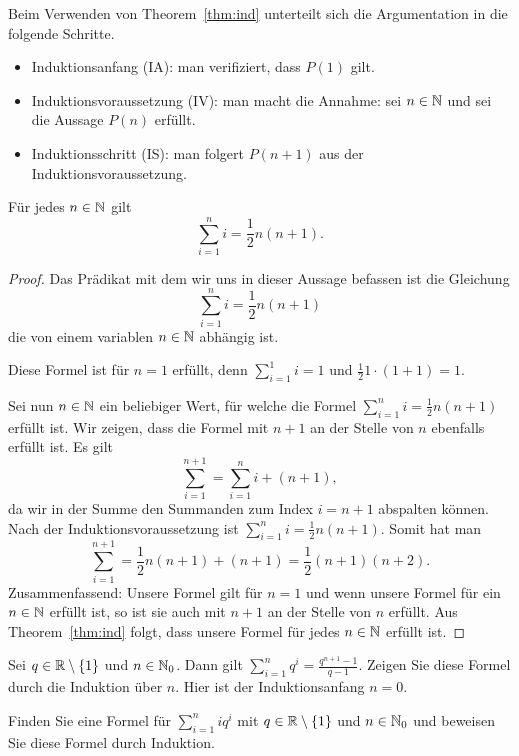 \begin{bem}
	Beim Verwenden von Theorem~\ref{thm:ind} unterteilt sich die Argumentation in die folgende Schritte. 
	\begin{itemize}
		\item Induktionsanfang (IA): man verifiziert, dass $P(1)$ gilt. 
		\item Induktionsvoraussetzung (IV): man macht die Annahme: sei $n \in \mathbb{N}$ und sei die Aussage $P(n)$ erfüllt. 
		\item Induktionsschritt (IS): man folgert $P(n+1)$ aus der Induktionsvoraussetzung.  
	\end{itemize} 
\end{bem} 

\begin{thm}
	Für jedes $n \in \mathbb{N}$ gilt 
	\[
		\sum_{i=1}^n i = \frac{1}{2} n (n+1). 
	\]
\end{thm} 
\begin{proof} 
		Das Prädikat mit dem wir uns in dieser Aussage befassen ist die Gleichung $$\sum_{i=1}^n i = \frac{1}{2} n (n+1)$$ die von einem variablen $n \in \mathbb{N}$ abhängig ist. 
		
		Diese Formel ist für $n=1$ erfüllt, denn $\sum_{i=1}^1 i = 1$ und $\frac{1}{2} 1 \cdot (1+1) = 1$. 
		
		Sei nun $n \in \mathbb{N}$ ein beliebiger Wert, für welche die Formel $\sum_{i=1}^n  i = \frac{1}{2} n (n+1)$ erfüllt ist. Wir zeigen, dass die Formel mit $n+1$ an der Stelle von $n$ ebenfalls erfüllt ist. Es gilt 
		\[
			\sum_{i=1}^{n+1} = \sum_{i=1}^n i  + (n+1),
		\]
		da wir in der Summe den Summanden zum Index $i=n+1$ abspalten können. Nach der Induktionsvoraussetzung ist $\sum_{i=1}^n i = \frac{1}{2} n (n+1)$. Somit hat man 
		\[
			\sum_{i=1}^{n+1} = \frac{1}{2} n (n+1) + (n+1) = \frac{1}{2} (n+1) (n+2). 
		\]
		Zusammenfassend: Unsere Formel gilt für $n=1$ und wenn unsere Formel für ein $n \in \mathbb{N}$ erfüllt ist, so ist sie auch mit $n+1$ an der Stelle von $n$ erfüllt. Aus Theorem~\ref{thm:ind} folgt, dass unsere Formel für jedes $n \in \mathbb{N}$ erfüllt ist. 
\end{proof} 


\begin{bsp}
	Sei $q \in \mathbb{R} \setminus \{1\}$ und $n \in \mathbb{N}_0$. Dann gilt $\sum_{i=1}^n q^i = \frac{q^{n+1} - 1}{q-1}$. Zeigen Sie diese Formel durch die Induktion über $n$. Hier ist der Induktionsanfang $n=0$. 
\end{bsp} 

\begin{bsp}
	Finden Sie eine Formel für $\sum_{i=1}^n i q^i$ mit $q \in \mathbb{R} \setminus \{1\}$ und $n \in \mathbb{N}_0$ und beweisen Sie diese Formel durch Induktion. 
\end{bsp} 

